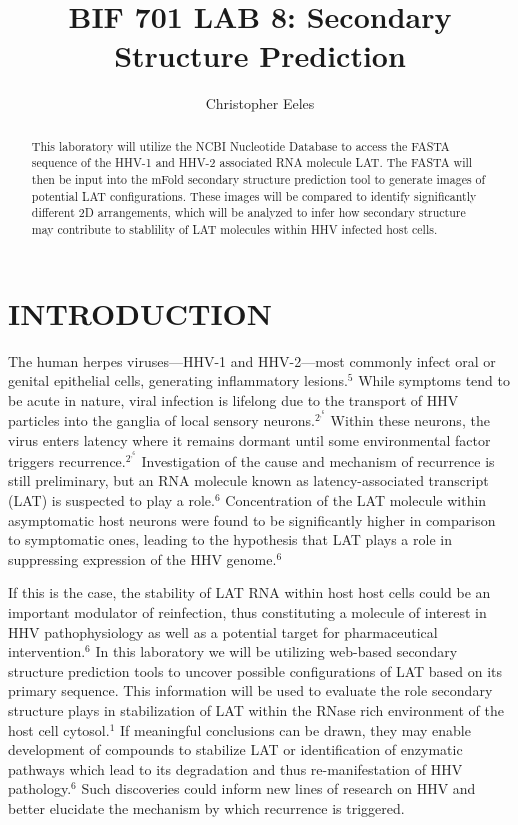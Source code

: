 \documentclass[letterpaper, 10 pt, conference]{ieeeconf}  %
\title{\LARGE \bf
BIF 701 LAB 8: Secondary Structure Prediction
}
\author{Christopher Eeles%
}
\begin{document}
\maketitle
\thispagestyle{empty}
\pagestyle{empty}

\begin{abstract}

This laboratory will utilize the NCBI Nucleotide Database to access the FASTA sequence of the HHV-1 and HHV-2 associated RNA molecule LAT. The FASTA will then be input into the mFold secondary structure prediction tool to generate images of potential LAT configurations. These images will be compared to identify significantly different 2D arrangements, which will be analyzed to infer how secondary structure may contribute to stablility of LAT molecules within HHV infected host cells.

\end{abstract}

\section{INTRODUCTION}

The human herpes viruses---HHV-1 and HHV-2---most commonly infect oral or genital epithelial cells, generating inflammatory lesions.$^5$ While symptoms tend to be acute in nature, viral infection is lifelong due to the transport of HHV particles into the ganglia of local sensory neurons.$^2^,^6$ Within these neurons, the virus enters latency where it remains dormant until some environmental factor triggers recurrence.$^2^,^6$ Investigation of the cause and mechanism of recurrence is still preliminary, but an RNA molecule known as latency-associated transcript (LAT) is suspected to play a role.$^6$ Concentration of the LAT molecule within asymptomatic host neurons were found to be significantly higher in comparison to symptomatic ones, leading to the hypothesis that LAT plays a role in suppressing expression of the HHV genome.$^6$ 

If this is the case, the stability of LAT RNA within host host cells could be an important modulator of reinfection, thus constituting a molecule of interest in HHV pathophysiology as well as a potential target for pharmaceutical intervention.$^6$ In this laboratory we will be utilizing web-based secondary structure prediction tools to uncover possible configurations of LAT based on its primary sequence. This information will be used to evaluate the role secondary structure plays in stabilization of LAT within the RNase rich environment of the host cell cytosol.$^1$ If meaningful conclusions can be drawn, they may enable development of compounds to stabilize LAT or identification of enzymatic pathways which lead to its degradation and thus re-manifestation of HHV pathology.$^6$ Such discoveries could inform new lines of research on HHV and better elucidate the mechanism by which recurrence is triggered.
\end{document}

